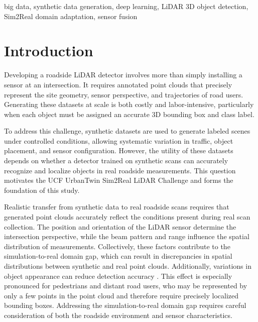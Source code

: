 \documentclass[conference]{IEEEtran}
\begin{document}
\begin{IEEEkeywords}
big data, synthetic data generation, deep learning, LiDAR 3D object detection, Sim2Real domain adaptation, sensor fusion
\end{IEEEkeywords}

\section{Introduction}
\label{sec:intro}


Developing a roadside LiDAR detector involves more than simply installing a sensor at an intersection. It requires annotated point clouds that precisely represent the site geometry, sensor perspective, and trajectories of road users. Generating these datasets at scale is both costly and labor-intensive, particularly when each object must be assigned an accurate 3D bounding box and class label.

To address this challenge, synthetic datasets are used to generate labeled scenes under controlled conditions, allowing systematic variation in traffic, object placement, and sensor configuration. However, the utility of these datasets depends on whether a detector trained on synthetic scans can accurately recognize and localize objects in real roadside measurements. This question motivates the UCF UrbanTwin Sim2Real LiDAR Challenge \cite{shahbaz2026hifidelity} and forms the foundation of this study.

Realistic transfer from synthetic data to real roadside scans requires that generated point clouds accurately reflect the conditions present during real scan collection. The position and orientation of the LiDAR sensor determine the intersection perspective, while the beam pattern and range influence the spatial distribution of measurements. Collectively, these factors contribute to the simulation-to-real domain gap, which can result in discrepancies in spatial distributions between synthetic and real point clouds.
Additionally, variations in object appearance can reduce detection accuracy \cite{shahbaz2026hifidelity}. This effect is especially pronounced for pedestrians and distant road users, who may be represented by only a few points in the point cloud and therefore require
precisely localized bounding boxes. Addressing the simulation-to-real domain gap requires careful consideration of both the roadside environment and sensor characteristics.
\end{document}
